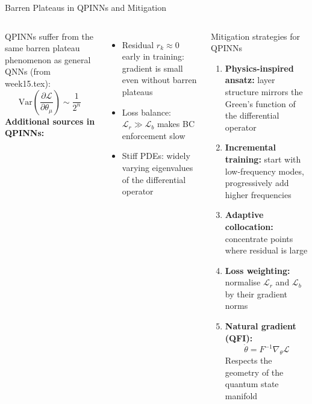 \documentclass[aspectratio=169,10pt]{beamer}
\begin{document}
\begin{frame}{Barren Plateaus in QPINNs and Mitigation}
  \begin{columns}[T]
      QPINNs suffer from the same barren plateau phenomenon
      as general QNNs (from week15.tex):
      \[
        \mathrm{Var}\!\left(
          \frac{\partial\mathcal{L}}{\partial\theta_\mu}
        \right)
        \sim \frac{1}{2^n}
      \]
      \textbf{Additional sources in QPINNs:}
      \begin{itemize}
        \item Residual $r_k\approx 0$ early in training:
              gradient is small even without barren plateaus
        \item Loss balance: $\mathcal{L}_r\gg\mathcal{L}_b$
              makes BC enforcement slow
        \item Stiff PDEs: widely varying eigenvalues of the
              differential operator
      \end{itemize}
      \begin{block}{Mitigation strategies for QPINNs}
        \begin{enumerate}
          \item \textbf{Physics-inspired ansatz:}
                layer structure mirrors the Green's function
                of the differential operator
          \item \textbf{Incremental training:}
                start with low-frequency modes,
                progressively add higher frequencies
          \item \textbf{Adaptive collocation:}
                concentrate points where residual is large
          \item \textbf{Loss weighting:}
                normalise $\mathcal{L}_r$ and $\mathcal{L}_b$
                by their gradient norms
          \item \textbf{Natural gradient (QFI):}
                \[
                  \dot\theta = F^{-1}\nabla_\theta\mathcal{L}
                \]
                Respects the geometry of the quantum
                state manifold
        \end{enumerate}
      \end{block}
  \end{columns}
\end{frame}
\end{document}
